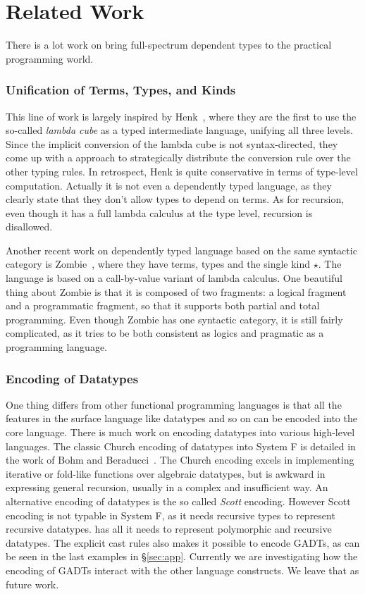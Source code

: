 \section{Related Work}

There is a lot work on bring full-spectrum dependent types to the practical programming world.

\subsubsection{Unification of Terms, Types, and Kinds}

This line of work is largely inspired by Henk~\cite{pts:henk}, where they are the first to use the so-called \emph{lambda cube} as a typed intermediate language, unifying all three levels. Since the implicit conversion of the lambda cube is not syntax-directed, they come up with a approach to strategically distribute the conversion rule over the other typing rules. In retrospect, Henk is quite conservative in terms of type-level computation. Actually it is not even a dependently typed language, as they clearly state that they don't allow types to depend on terms. As for recursion, even though it has a full lambda calculus at the type level, recursion is disallowed.

Another recent work on dependently typed language based on the same syntactic category is \textsf{Zombie}~\cite{zombie:popl14, zombie:thesis}, where they have terms, types and the single kind $\star$. The language is based on a call-by-value variant of lambda calculus. One beautiful thing about Zombie is that it is composed of two fragments: a logical fragment and a programmatic fragment, so that it supports both partial and total programming. Even though Zombie has one syntactic category, it is still fairly complicated, as it tries to be both consistent as logics and pragmatic as a programming language.

\subsubsection{Encoding of Datatypes}

One thing \name differs from other functional programming languages is that all the features in the surface language like datatypes and so on can be encoded into the core language. There is much work on encoding datatypes into various high-level languages. The classic Church encoding of datatypes into System F is detailed in the work of Bohm and Beraducci~\cite{Bohm1985}. The Church encoding excels in implementing iterative or fold-like functions over algebraic datatypes, but is awkward in expressing general recursion, usually in a complex and insufficient way. An alternative encoding of datatypes is the so called \emph{Scott} encoding. However Scott encoding is not typable in System F, as it needs recursive types to represent recursive datatypes. \name has all it needs to represent polymorphic and recursive datatypes. The explicit cast rules also makes it possible to encode GADTs, as can be seen in the last examples in \S\ref{sec:app}. Currently we are investigating how the encoding of GADTs interact with the other language constructs. We leave that as future work.

